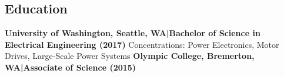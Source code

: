 \documentclass[]{article}
\begin{document}
\begin{singlespace}
\section*{Education}

\textbf{University of Washington, Seattle, WA\hspace{3 mm}|\hspace{3 mm}Bachelor of Science in Electrical Engineering (2017)}
\newline Concentrations: Power Electronics, Motor Drives, Large-Scale Power Systems
\vspace{-3mm}
\newline\break\textbf{Olympic College, Bremerton, WA\hspace{3 mm}|\hspace{3 mm}Associate of Science (2015)}

\end{singlespace}
\end{document}
